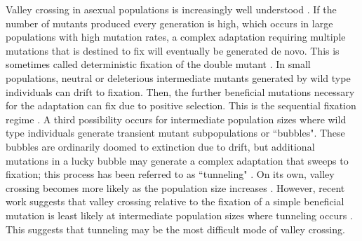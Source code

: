 \documentclass[rmp]{revtex4}
\begin{document}
\begin{spacing}{1.5}
Valley crossing in asexual populations is increasingly well understood \citep{weissman_2009}.
If the number of mutants produced every generation is high, which occurs in large populations with high mutation rates, a complex adaptation requiring multiple mutations that is destined to fix will eventually be generated de novo. This is sometimes called deterministic fixation of the double mutant \citep{weissman_2009}.
In small populations, neutral or deleterious intermediate mutants generated by wild type individuals can drift to fixation. Then, the further beneficial mutations necessary for the adaptation can fix due to positive selection. This is the sequential fixation regime \citep{weissman_2009}.
A third possibility occurs for intermediate population sizes where wild type individuals generate transient mutant subpopulations or ``bubbles".
These bubbles are ordinarily doomed to extinction due to drift, but additional mutations in a lucky bubble may generate a complex adaptation that sweeps to fixation; this process has been referred to as ``tunneling" \citep{iwasa_2004, weissman_2009}.
On its own, valley crossing becomes more likely as the population size increases \citep{weissman_2009}. However, recent work suggests that valley crossing relative to the fixation of a simple beneficial mutation is least likely at intermediate population sizes where tunneling occurs \citet{ochs_2015}. This suggests that tunneling may be the most difficult mode of valley crossing. 


\end{spacing}
\end{document}
